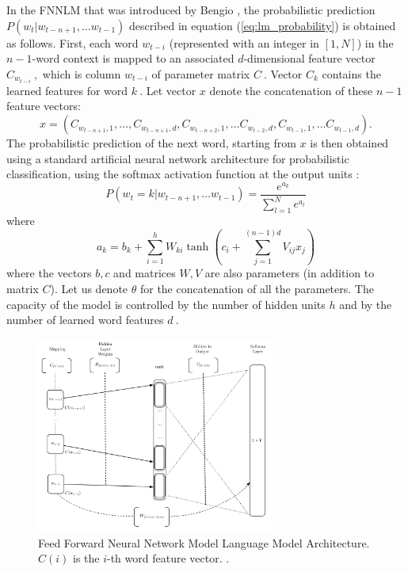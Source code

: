 In the \ac{FNNLM} that was introduced by Bengio
\cite{Bengio:2003:NPL:944919.944966},  the probabilistic prediction $P(w_t | w_{t-n+1}, \ldots w_{t-1})$ described
in equation (\ref{eq:lm_probability}) is obtained as follows. First, each word $w_{t-i}$ (represented
with an integer in $[1,N]$) in the  $n-1$-word context is mapped
to an associated $d$-dimensional feature vector $C_{w_{t-i}}\ ,$ which is
column $w_{t-i}$ of parameter matrix $C\ .$ Vector $C_k$
contains the learned features for word $k\ .$
Let vector $x$ denote the concatenation of these $n-1$
feature vectors:
\begin{equation}
  x = (C_{w_{t-n+1},1}, \ldots, C_{w_{t-n+1},d}, C_{w_{t-n+2},1}, \ldots C_{w_{t-2},d}, C_{w_{t-1},1}, \ldots C_{w_{t-1},d}).
\end{equation}
The probabilistic prediction of the next word, starting from $x$
is then obtained using a standard artificial neural network architecture
for probabilistic classification, using the softmax activation function at the output units \cite{Bishop:1995:NNP:525960}:
\begin{equation}
 P(w_t=k | w_{t-n+1}, \ldots w_{t-1}) = \frac{e^{a_k}}{\sum_{l=1}^N e^{a_l}}
\end{equation}
where
\begin{equation}
 a_k = b_k + \sum_{i=1}^h W_{ki} \tanh(c_i + \sum_{j=1}^{(n-1)d} V_{ij} x_j)
\end{equation}
where the vectors $b,c$ and matrices $W,V$ are also
parameters (in addition to matrix $C$). Let us denote
$\theta$ for the concatenation of all the parameters.
The capacity of the model is controlled by the number of hidden units $h$
and by the number of learned word features $d\ .$ 


\begin{figure}[h]
    \centering
    \includegraphics[width=0.7\textwidth]{images/bengio-nnlm.pdf}
    \caption{Feed Forward Neural Network Model Language Model Architecture.
       $C(i)$ is the $i$-th word feature vector.  \cite{Bengio:2003:NPL:944919.944966}.}
    \label{fig:NNLM_architecture}
\end{figure}

